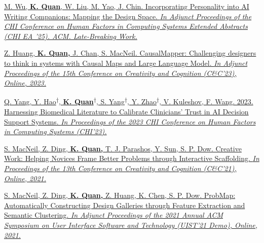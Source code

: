 \documentclass[a4paper,11pt]{article}
\begin{document}
\begin{bibenum}
\item \href{https://dl.acm.org/doi/10.1145/3706599.3720185}
{M. Wu, \textbf{K. Quan}, W. Liu, M. Yao, J. Chin. Incorporating Personality into AI Writing Companions: Mapping the Design Space. 
\emph{ In Adjunct Proceedings of the CHI Conference on Human Factors in Computing Systems Extended Abstracts (CHI EA '25). ACM. Late-Breaking Work. } }
\label{chilbw}

\item \href {https://dl.acm.org/doi/abs/10.1145/3591196.3596818}
{Z. Huang, \textbf{K. Quan,} J. Chan, S. MacNeil. CausalMapper: Challenging designers to think in systems with Causal Maps and Large Language Model.
\emph{In Adjunct Proceedings of the 15th Conference on Creativity and Cognition (C\&C’23), Online, 2023.} }
\label{causalmapper}

\item \href{https://dl.acm.org/doi/fullHtml/10.1145/3544548.3581393}
{Q. Yang, Y. Hao\textsuperscript{$\dagger$}, \textbf{K. Quan\textsuperscript{$\dagger$}}, S. Yang\textsuperscript{$\dagger$}, Y. Zhao\textsuperscript{$\dagger$}, V. Kuleshov, F. Wang. 2023. Harnessing Biomedical Literature to Calibrate Clinicians’ Trust in AI Decision Support Systems.
\emph{In Proceedings of the 2023 CHI Conference on Human Factors in Computing Systems (CHI’23).}}
\label{calibrate_trust}

\item \href{https://dl.acm.org/doi/abs/10.1145/3450741.3465261}{S. MacNeil, Z. Ding, \textbf{K. Quan,} T. J. Parashos, Y. Sun, S. P. Dow. Creative Work: Helping Novices Frame Better Problems through Interactive Scaffolding.
\emph{In Proceedings of the 13th Conference on Creativity and Cognition (C\&C’21), Online, 2021.}}
\label{problib}

\item \href{https://dl.acm.org/doi/10.1145/3474349.3480203}{S. MacNeil, Z. Ding, \textbf{K. Quan,} Z. Huang, K. Chen, S. P. Dow. ProbMap: Automatically Constructing Design Galleries through Feature Extraction and Semantic Clustering.
\emph{In Adjunct Proceedings of the 2021 Annual ACM Symposium on User Interface Software and Technology (UIST’21 Demo), Online, 2021.} }
\label{probmap}

\end{bibenum}
\end{document}
